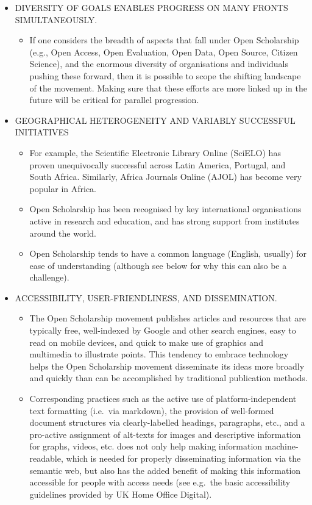\documentclass[]{article}
\providecommand{\tightlist}{%
  \setlength{\itemsep}{0pt}\setlength{\parskip}{0pt}}
\begin{document}
\begin{itemize}
\item
  DIVERSITY OF GOALS ENABLES PROGRESS ON MANY FRONTS SIMULTANEOUSLY.

  \begin{itemize}
  \tightlist
  \item
    If one considers the breadth of aspects that fall under Open
    Scholarship (e.g., Open Access, Open Evaluation, Open Data, Open
    Source, Citizen Science), and the enormous diversity of
    organisations and individuals pushing these forward, then it is
    possible to scope the shifting landscape of the movement. Making
    sure that these efforts are more linked up in the future will be
    critical for parallel progression.
  \end{itemize}
\item
  GEOGRAPHICAL HETEROGENEITY AND VARIABLY SUCCESSFUL INITIATIVES

  \begin{itemize}
  \item
    For example, the Scientific Electronic Library Online (SciELO) has
    proven unequivocally successful across Latin America, Portugal, and
    South Africa. Similarly, Africa Journals Online (AJOL) has become
    very popular in Africa.
  \item
    Open Scholarship has been recognised by key international
    organisations active in research and education, and has strong
    support from institutes around the world.
  \item
    Open Scholarship tends to have a common language (English, usually)
    for ease of understanding (although see below for why this can also
    be a challenge).
  \end{itemize}
\item
  ACCESSIBILITY, USER-FRIENDLINESS, AND DISSEMINATION.

  \begin{itemize}
  \item
    The Open Scholarship movement publishes articles and resources that
    are typically free, well-indexed by Google and other search engines,
    easy to read on mobile devices, and quick to make use of graphics
    and multimedia to illustrate points. This tendency to embrace
    technology helps the Open Scholarship movement disseminate its ideas
    more broadly and quickly than can be accomplished by traditional
    publication methods.
  \item
    Corresponding practices such as the active use of
    platform-independent text formatting (i.e.~via markdown), the
    provision of well-formed document structures via clearly-labelled
    headings, paragraphs, etc., and a pro-active assignment of alt-texts
    for images and descriptive information for graphs, videos, etc. does
    not only help making information machine-readable, which is needed
    for properly disseminating information via the semantic web, but
    also has the added benefit of making this information accessible for
    people with access needs (see e.g.~the basic accessibility
    guidelines provided by UK Home Office Digital).
  \end{itemize}
\end{itemize}
\end{document}
